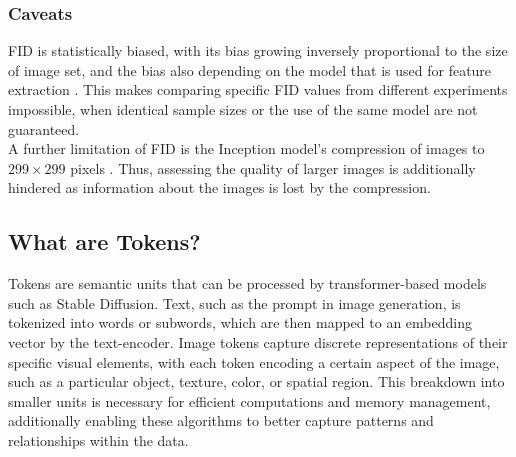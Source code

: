 \subsubsection{Caveats}
FID is statistically biased, with its bias growing inversely proportional to the size of image set, and the bias also depending on the model that is used for feature extraction \cite{Chong_2020_CVPR}. This makes comparing specific FID values from different experiments impossible, when identical sample sizes or the use of the same model are not guaranteed.\\
A further limitation of FID is the Inception model's compression of images to $299 \times 299$ pixels \cite{szegedy2016rethinking}. Thus, assessing the quality of larger images is additionally hindered as information about the images is lost by the compression.



\subsection{What are Tokens?}
Tokens are semantic units that can be processed by transformer-based models such as Stable Diffusion. Text, such as the prompt in image generation, is tokenized into words or subwords, which are then mapped to an embedding vector by the text-encoder. Image tokens capture discrete representations of their specific visual elements, with each token encoding a certain aspect of the image, such as a particular object, texture, color, or spatial region. This breakdown into smaller units is necessary for efficient computations and memory management, additionally enabling these algorithms to better capture patterns and relationships within the data.